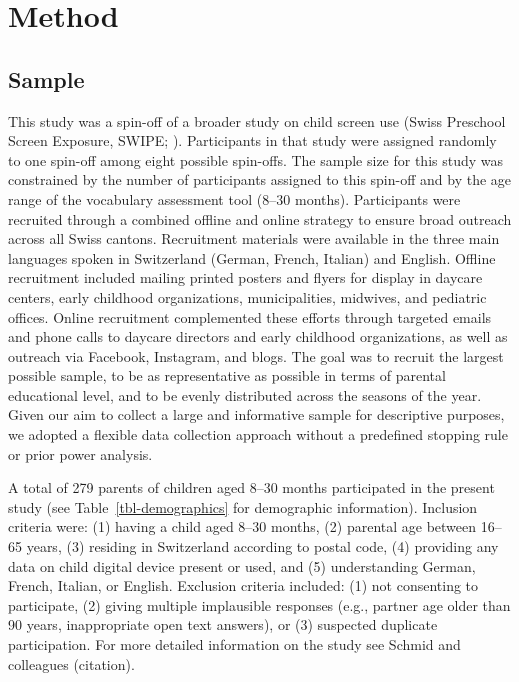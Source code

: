 \documentclass[
  man,
  floatsintext,
  longtable,
  nolmodern,
  notxfonts,
  notimes,
  colorlinks=true,linkcolor=blue,citecolor=blue,urlcolor=blue]{apa7}
\begin{document}
\vspace{1em}

\section{Method}\label{method}

\subsection{Sample}\label{sample}

This study was a spin-off of a broader study on child screen use (Swiss
Preschool Screen Exposure, SWIPE;
).
Participants in that study were assigned randomly to one spin-off among
eight possible spin-offs. The sample size for this study was constrained
by the number of participants assigned to this spin-off and by the age
range of the vocabulary assessment tool (8--30 months). Participants
were recruited through a combined offline and online strategy to ensure
broad outreach across all Swiss cantons. Recruitment materials were
available in the three main languages spoken in Switzerland (German,
French, Italian) and English. Offline recruitment included mailing
printed posters and flyers for display in daycare centers, early
childhood organizations, municipalities, midwives, and pediatric
offices. Online recruitment complemented these efforts through targeted
emails and phone calls to daycare directors and early childhood
organizations, as well as outreach via Facebook, Instagram, and blogs.
The goal was to recruit the largest possible sample, to be as
representative as possible in terms of parental educational level, and
to be evenly distributed across the seasons of the year. Given our aim
to collect a large and informative sample for descriptive purposes, we
adopted a flexible data collection approach without a predefined
stopping rule or prior power analysis.

A total of 279 parents of children aged 8--30 months participated in the
present study (see Table~\ref{tbl-demographics} for demographic
information). Inclusion criteria were: (1) having a child aged 8--30
months, (2) parental age between 16--65 years, (3) residing in
Switzerland according to postal code, (4) providing any data on child
digital device present or used, and (5) understanding German, French,
Italian, or English. Exclusion criteria included: (1) not consenting to
participate, (2) giving multiple implausible responses (e.g., partner
age older than 90 years, inappropriate open text answers), or (3)
suspected duplicate participation. For more detailed information on the
study see Schmid and colleagues (citation).
\end{document}
